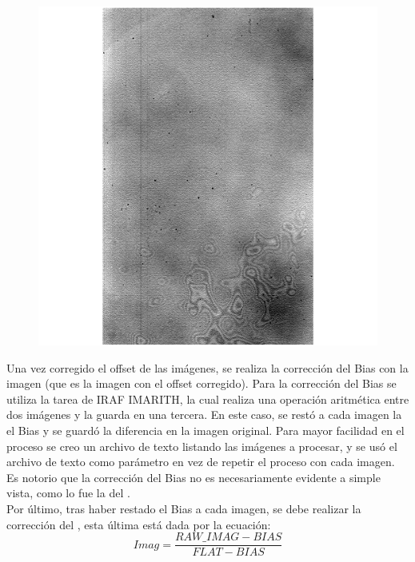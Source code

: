\documentclass[12pt]{article}
\begin{document}
\begin{figure}[H]
  \centering
   \includegraphics[scale= 0.5]{im03.png}
  \label{im03}
\end{figure}

Una vez corregido el offset de las imágenes, se realiza la corrección del Bias con la imagen  (que es la imagen  con el offset corregido). Para la corrección del Bias se utiliza la tarea de IRAF IMARITH, la cual realiza una operación aritmética entre dos imágenes y la guarda en una tercera. En este caso, se restó a cada imagen la el Bias  y se guardó la diferencia en la imagen original. Para mayor facilidad en el proceso se creo un archivo de texto listando las imágenes a procesar, y se usó el archivo de texto como parámetro en vez de repetir el proceso con cada imagen. Es notorio que la corrección del Bias no es necesariamente evidente a simple vista, como lo fue la del .\\

Por último, tras haber restado el Bias a cada imagen, se debe realizar la corrección del , esta última está dada por la ecuación:
\begin{equation}
Imag = \frac{RAW\_IMAG - BIAS}{FLAT - BIAS}
\label{unica}
\end{equation}
\end{document}
